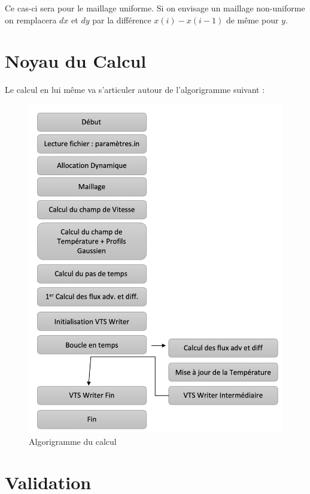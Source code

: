 \documentclass[a4paper,oneside]{article}
\makeatletter
\def\bigcenter{\trivlist \bigcentering\item\relax}
\def\bigcentering{\let\\\@centercr\rightskip\@bigflushglue%
\leftskip\@bigflushglue
\parindent\z@\parfillskip\z@skip}
\makeatother
\begin{document}
Ce cas-ci sera pour le maillage uniforme.
Si on envisage un maillage non-uniforme on remplacera $dx$ et $dy$ par la différence $x(i)-x(i-1)$ de même pour $y$.

\section{Noyau du Calcul}

Le calcul en lui même va s'articuler autour de l'algorigramme suivant :

\begin{figure}[h!]
\bigcenter
\includegraphics[scale=0.4]{Algo.PNG}
\caption{Algorigramme du calcul}
\end{figure}





\section{Validation}
\end{document}
